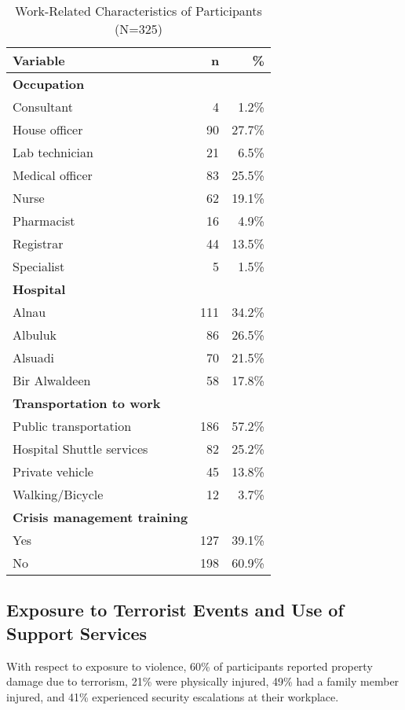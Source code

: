 \documentclass[12pt]{article}
\begin{document}
\begin{table}[h!]
\centering
\caption{Work-Related Characteristics of Participants (N=325)}
\label{tab:table2}
\begin{tabular}{lrr}
\toprule
\textbf{Variable} & \textbf{n} & \textbf{\%} \\
\midrule
\textbf{Occupation} & & \\
\quad Consultant & 4 & 1.2\% \\
\quad House officer & 90 & 27.7\% \\
\quad Lab technician & 21 & 6.5\% \\
\quad Medical officer & 83 & 25.5\% \\
\quad Nurse & 62 & 19.1\% \\
\quad Pharmacist & 16 & 4.9\% \\
\quad Registrar & 44 & 13.5\% \\
\quad Specialist & 5 & 1.5\% \\
\midrule
\textbf{Hospital} & & \\
\quad Alnau & 111 & 34.2\% \\
\quad Albuluk & 86 & 26.5\% \\
\quad Alsuadi & 70 & 21.5\% \\
\quad Bir Alwaldeen & 58 & 17.8\% \\
\midrule
\textbf{Transportation to work} & & \\
\quad Public transportation & 186 & 57.2\% \\
\quad Hospital Shuttle services & 82 & 25.2\% \\
\quad Private vehicle & 45 & 13.8\% \\
\quad Walking/Bicycle & 12 & 3.7\% \\
\midrule
\textbf{Crisis management training} & & \\
\quad Yes & 127 & 39.1\% \\
\quad No & 198 & 60.9\% \\
\bottomrule
\end{tabular}
\end{table}
\afterpage{\clearpage} %

\subsection{Exposure to Terrorist Events and Use of Support Services}
With respect to exposure to violence, 60\% of participants reported property damage due to terrorism, 21\% were physically injured, 49\% had a family member injured, and 41\% experienced security escalations at their workplace.
\end{document}
